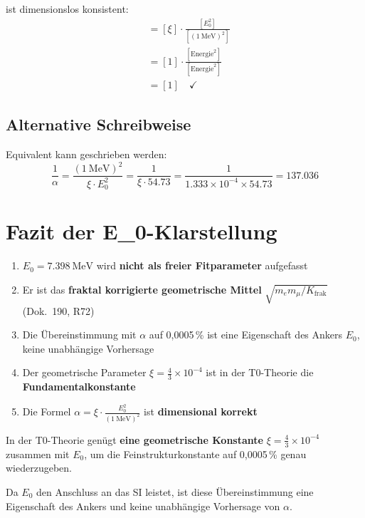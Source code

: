 	ist dimensionslos konsistent:
	\begin{align}
		[\alpha] &= [\xi] \cdot \frac{[E_0^2]}{[( \SI{1}{\MeV} )^2]} \\
		&= [1] \cdot \frac{[\text{Energie}^2]}{[\text{Energie}^2]} \\
		&= [1] \quad \checkmark
	\end{align}
	
	\subsection{Alternative Schreibweise}
	
	Equivalent kann geschrieben werden:
	\begin{equation}
		\frac{1}{\alpha} = \frac{( \SI{1}{\MeV} )^2}{\xi \cdot E_0^2} = \frac{1}{\xi \cdot 54.73} = \frac{1}{1.333 \times 10^{-4} \times 54.73} = 137.036
	\end{equation}
	
	\section{Fazit der E\_0-Klarstellung}
	
	\begin{tcolorbox}[colback=red!5!white,colframe=red!75!black,title=Zusammenfassung E\_0-Analyse]
		\begin{enumerate}
			\item $E_0 = \SI{7.398}{\MeV}$ wird \textbf{nicht als freier Fitparameter} aufgefasst
			\item Er ist das \textbf{fraktal korrigierte geometrische Mittel} $\sqrt{m_e m_\mu/K_{\text{frak}}}$ (Dok.~190, R72)
			\item Die Übereinstimmung mit $\alpha$ auf 0,0005\,\% ist eine Eigenschaft des Ankers $E_0$, keine unabhängige Vorhersage
			\item Der geometrische Parameter $\xi = \frac{4}{3} \times 10^{-4}$ ist in der T0-Theorie die \textbf{Fundamentalkonstante}
			\item Die Formel $\alpha = \xi \cdot \frac{E_0^2}{( \SI{1}{\MeV} )^2}$ ist \textbf{dimensional korrekt}
		\end{enumerate}
	\end{tcolorbox}
	
	\begin{tcolorbox}[colback=green!10!white,colframe=green!75!black,title=Ergebnis der E\_0-Analyse]
		In der T0-Theorie genügt \textbf{eine geometrische Konstante} $\xi = \frac{4}{3} \times 10^{-4}$ zusammen mit $E_0$, um die Feinstrukturkonstante auf 0,0005\,\% genau wiederzugeben.
		
		Da $E_0$ den Anschluss an das SI leistet, ist diese Übereinstimmung eine Eigenschaft des Ankers und keine unabhängige Vorhersage von $\alpha$.
	\end{tcolorbox}
	
